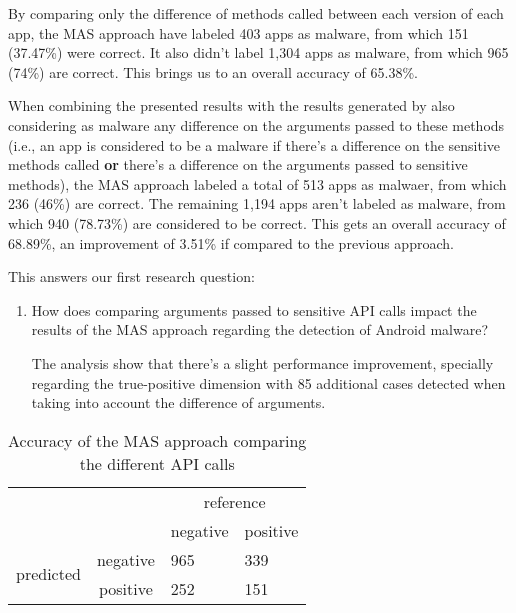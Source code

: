 By comparing only the difference of methods called between each version of each app, the MAS approach have labeled 403 apps as malware, from which 151 (37.47\%) were correct. It also didn't label 1,304 apps as malware, from which 965 (74\%) are correct. This brings us to an overall accuracy of 65.38\%.

When combining the presented results with the results generated by also considering as malware any difference on the arguments passed to these methods (i.e., an app is considered to be a malware if there's a difference on the sensitive methods called \textbf{or} there's a difference on the arguments passed to sensitive methods), the MAS approach labeled a total of 513 apps as malwaer, from which 236 (46\%) are correct. The remaining 1,194 apps aren't labeled as malware, from which 940 (78.73\%) are considered to be correct. This gets an overall accuracy of 68.89\%, an improvement of 3.51\% if compared to the previous approach. 

This answers our first research question: 

\begin{enumerate}
    \item How does comparing arguments passed to sensitive API calls impact the results of the MAS approach regarding the detection of Android malware?

    The analysis show that there's a slight performance improvement, specially regarding the true-positive dimension with 85 additional cases detected when taking into account the difference of arguments. 
\end{enumerate}

\begin{table}[]
\centering
\caption{Accuracy of the MAS approach comparing the different API calls}
\label{tab:prev-confusion-matrix}
\begin{tabular}{llll}
                                                &                               & \multicolumn{2}{c}{reference}                                 \\ \cline{3-4} 
                                                & \multicolumn{1}{l|}{}         & \multicolumn{1}{c|}{negative} & \multicolumn{1}{c|}{positive} \\ \cline{2-4} 
\multicolumn{1}{c|}{\multirow{2}{*}{predicted}} & \multicolumn{1}{c|}{negative} & \multicolumn{1}{l|}{965}      & \multicolumn{1}{l|}{339}      \\ \cline{2-4} 
\multicolumn{1}{c|}{}                           & \multicolumn{1}{c|}{positive} & \multicolumn{1}{l|}{252}      & \multicolumn{1}{l|}{151}      \\ \cline{2-4} 
\end{tabular}
\end{table}

